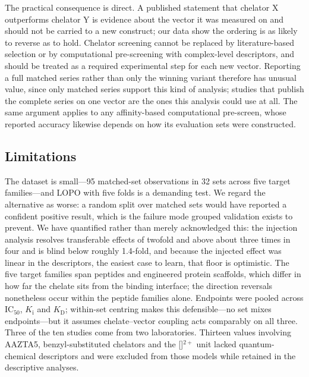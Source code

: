 The practical consequence is direct. A published statement that chelator X outperforms chelator Y is evidence about the vector it was measured on and should not be carried to a new construct; our data show the ordering is as likely to reverse as to hold. Chelator screening cannot be replaced by literature-based selection or by computational pre-screening with complex-level descriptors, and should be treated as a required experimental step for each new vector. Reporting a full matched series rather than only the winning variant therefore has unusual value, since only matched series support this kind of analysis; studies that publish the complete series on one vector\cite{Kim2026PbSSTR2,Guenther2022,Abouzayed2023} are the ones this analysis could use at all. The same argument applies to any affinity-based computational pre-screen, whose reported accuracy likewise depends on how its evaluation sets were constructed.\cite{Kang2026Docking,Kang2026GasBench}

\subsection{Limitations}

The dataset is small---95 matched-set observations in 32 sets across five target families---and LOPO with five folds is a demanding test. We regard the alternative as worse: a random split over matched sets would have reported a confident positive result, which is the failure mode grouped validation exists to prevent.\cite{Kim2026TAS2R,Boldini2025UMAP} We have quantified rather than merely acknowledged this: the injection analysis resolves transferable effects of twofold and above about three times in four and is blind below roughly 1.4-fold, and because the injected effect was linear in the descriptors, the easiest case to learn, that floor is optimistic. The five target families span peptides and engineered protein scaffolds, which differ in how far the chelate sits from the binding interface; the direction reversals nonetheless occur within the peptide families alone. Endpoints were pooled across IC$_{50}$, $K_\text{i}$ and $K_\text{D}$; within-set centring makes this defensible---no set mixes endpoints---but it assumes chelate--vector coupling acts comparably on all three. Three of the ten studies come from two laboratories. Thirteen values involving AAZTA5, benzyl-substituted chelators and the []$^{2+}$ unit lacked quantum-chemical descriptors and were excluded from those models while retained in the descriptive analyses.

